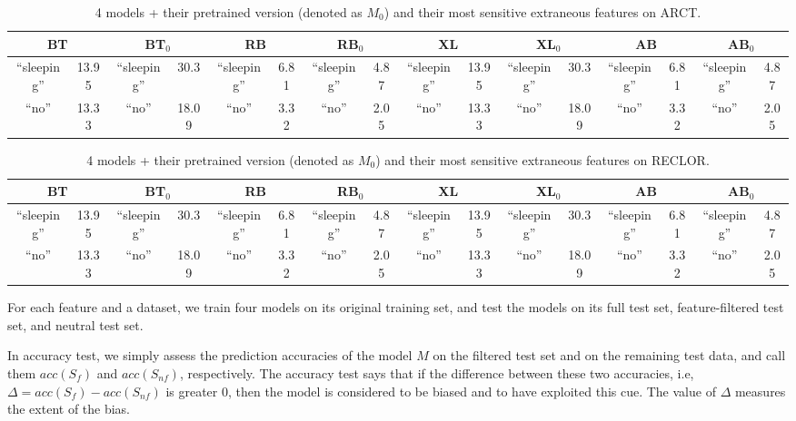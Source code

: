 \begin{table*}[th]
\centering
\scriptsize
\begin{tabular}{|cc|cc|cc|cc|cc|cc|cc|cc|} \hline
\multicolumn{2}{|c|}{BT} & \multicolumn{2}{c|}{BT$_0$} &\multicolumn{2}{c|}{RB}& \multicolumn{2}{c|}{RB$_0$}
	&\multicolumn{2}{c|}{XL} & \multicolumn{2}{c|}{XL$_0$} & \multicolumn{2}{c|}{AB} & \multicolumn{2}{c|}{AB$_0$} \\ \hline \hline
 ``sleeping'' & 13.95 & ``sleeping'' & 30.3 & ``sleeping'' & 6.81 & ``sleeping'' & 4.87 &``sleeping'' & 13.95 & ``sleeping'' & 30.3 & ``sleeping'' & 6.81 & ``sleeping'' & 4.87  \\\hline           
 ``no'' & 13.33 & ``no'' & 18.09 &``no'' &3.32 & ``no'' & 2.05 & ``no'' & 13.33 & ``no'' & 18.09 &``no'' &3.32 & ``no'' & 2.05 \\
\hline 
\end{tabular}
\caption{4 models + their pretrained version (denoted as $M_0$) 
and their most sensitive extraneous features on ARCT.}\label{tab:roc}
\end{table*}

\begin{table*}[th]
\centering
\scriptsize
\begin{tabular}{|cc|cc|cc|cc|cc|cc|cc|cc|} \hline
\multicolumn{2}{|c|}{BT} & \multicolumn{2}{c|}{BT$_0$} &\multicolumn{2}{c|}{RB}& \multicolumn{2}{c|}{RB$_0$}
	&\multicolumn{2}{c|}{XL} & \multicolumn{2}{c|}{XL$_0$} & \multicolumn{2}{c|}{AB} & \multicolumn{2}{c|}{AB$_0$} \\ \hline \hline
 ``sleeping'' & 13.95 & ``sleeping'' & 30.3 & ``sleeping'' & 6.81 & ``sleeping'' & 4.87 &``sleeping'' & 13.95 & ``sleeping'' & 30.3 & ``sleeping'' & 6.81 & ``sleeping'' & 4.87  \\\hline           
 ``no'' & 13.33 & ``no'' & 18.09 &``no'' &3.32 & ``no'' & 2.05 & ``no'' & 13.33 & ``no'' & 18.09 &``no'' &3.32 & ``no'' & 2.05 \\
\hline 
\end{tabular}
\caption{4 models + their pretrained version (denoted as $M_0$) 
and their most sensitive extraneous features on RECLOR.}\label{tab:roc}
\end{table*}


For each feature and a dataset, 
we train four models on its original training set,
and test the models on its full test set, feature-filtered test set, and neutral test set.   

In accuracy test, we simply assess the prediction accuracies of the model
$M$ on the filtered test set and on the remaining test data, and call them
$acc(S_f)$ and $acc(S_{nf})$, respectively. The accuracy test says that if the difference
between these two accuracies, i.e, $\Delta=acc(S_f) - acc(S_{nf})$ is greater 0, then the
model is considered to be biased and to have exploited this cue.
The value of $\Delta$ measures the extent of the bias.


